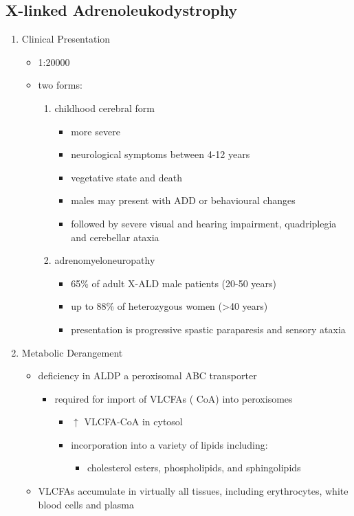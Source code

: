 \documentclass{scrartcl}
\begin{document}
\subsection{X-linked Adrenoleukodystrophy}
\label{sec:org7ac5e27}
\begin{enumerate}
\item Clinical Presentation
\label{sec:orgad86f9e}
\begin{itemize}
\item 1:20000
\item two forms:
\begin{enumerate}
\item childhood cerebral form
\begin{itemize}
\item more severe
\item neurological symptoms between 4-12 years
\item vegetative state and death
\item males may present with ADD or behavioural changes
\item followed by severe visual and hearing impairment, quadriplegia and
cerebellar ataxia
\end{itemize}
\item adrenomyeloneuropathy
\begin{itemize}
\item 65\% of adult X-ALD male patients (20-50 years)
\item up to 88\% of heterozygous women (\textgreater{}40 years)
\item presentation is progressive spastic paraparesis and sensory ataxia
\end{itemize}
\end{enumerate}
\end{itemize}

\item Metabolic Derangement
\label{sec:orgb24091f}
\begin{itemize}
\item deficiency in ALDP a peroxisomal ABC transporter
\begin{itemize}
\item required for import of VLCFAs (\textpm{} CoA) into peroxisomes
\begin{itemize}
\item \(\uparrow\) VLCFA-CoA in cytosol
\item incorporation into a variety of lipids including:
\begin{itemize}
\item cholesterol esters, phospholipids, and sphingolipids
\end{itemize}
\end{itemize}
\end{itemize}
\item VLCFAs accumulate in virtually all tissues, including erythrocytes,
white blood cells and plasma
\end{itemize}


\end{enumerate}
\end{document}
